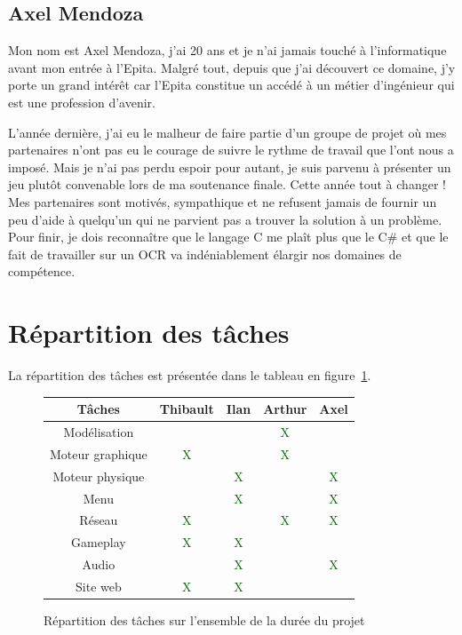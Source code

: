 \documentclass[11pt]{report}
\begin{document}
\subsection{Axel Mendoza}

Mon nom est Axel Mendoza, j'ai 20 ans et je n'ai jamais touché à l'informatique avant mon entrée à l'Epita. Malgré tout, depuis que j'ai découvert ce domaine, j'y porte un grand intérêt car l'Epita constitue un accédé à un  métier d'ingénieur qui est une profession d'avenir. 

L'année dernière, j'ai eu le malheur de faire partie d'un groupe de projet où mes partenaires n'ont pas eu le courage de suivre le rythme de travail que l'ont nous a imposé. Mais je n'ai pas perdu espoir pour autant, je suis parvenu à présenter un jeu plutôt convenable lors de ma soutenance finale. Cette année tout à changer ! Mes partenaires sont motivés, sympathique et ne refusent jamais de fournir un peu d'aide à quelqu'un qui ne parvient pas a trouver la solution à un problème. Pour finir, je dois reconnaître que le langage C me plaît plus que le C\# et que le fait de travailler sur un OCR va indéniablement élargir nos domaines de compétence.

\section{Répartition des tâches}

La répartition des tâches est présentée dans le tableau en figure~\ref{tab}.


\begin{figure}[htbp]
\centering
\begin{tabular}{ | c || c | c | c | c | }
\hline Tâches & Thibault & Ilan & Arthur & Axel \\
\hline Modélisation & & & \textcolor{darkgreen}{X} & \\
\hline Moteur graphique & \textcolor{darkgreen}{X} & & \textcolor{darkgreen}{X} & \\
\hline Moteur physique & & \textcolor{darkgreen}{X} & & \textcolor{darkgreen}{X} \\
\hline Menu & & \textcolor{darkgreen}{X} & & \textcolor{darkgreen}{X} \\
\hline Réseau & \textcolor{darkgreen}{X} & & \textcolor{darkgreen}{X} & \textcolor{darkgreen}{X} \\
\hline Gameplay & \textcolor{darkgreen}{X} & \textcolor{darkgreen}{X} & & \\
\hline Audio & & \textcolor{darkgreen}{X} & & \textcolor{darkgreen}{X} \\
\hline Site web & \textcolor{darkgreen}{X} & \textcolor{darkgreen}{X} & & \\
\hline
\end{tabular}
\caption{Répartition des tâches sur l'ensemble de la durée du projet}
\label{tab}
\end{figure}
\end{document}
